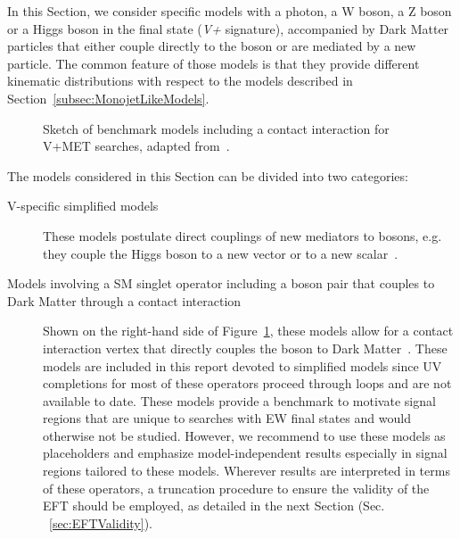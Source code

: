 
In this Section, we consider specific models with a photon, a W boson, a Z boson or a Higgs boson in the final state (\textit{V+\MET} signature), accompanied by Dark Matter particles that either couple directly to the boson or are mediated by a new particle. The common feature of those models is that they provide different kinematic distributions with respect to the models described in Section~\ref{subsec:MonojetLikeModels}.



\begin{figure}[h!]
	\centering
	\vspace{\baselineskip}
	\textwidth
	\begin{feynmandiagram}[modelVeft5pt]
	\end{feynmandiagram}
	
	\vspace{\baselineskip}
	\caption{Sketch of benchmark models including a contact interaction
		for V+MET searches, adapted from~\cite{Nelson:2013pqa}. \label{fig:VPlusMET_EFT}}
\end{figure}

The models considered in this Section can be divided into two categories:
\begin{description}
	\item[V-specific simplified models] These models postulate direct couplings of new mediators
	to bosons, e.g. they couple the Higgs boson to a new vector or to a new scalar~\cite{Carpenter:2013xra,Berlin:2014cfa}. 
	\item[Models involving a SM singlet operator including a boson pair that couples to Dark Matter through a contact interaction]
	Shown on the right-hand side of Figure~\ref{fig:VPlusMET_EFT},
	these models allow for a contact interaction vertex that directly couples the boson to Dark Matter~\cite{Cotta:2012nj, Carpenter:2012rg, Crivellin:2015wva,Berlin:2014cfa}.
	These models are included in this report devoted to simplified models since 
	UV completions for most of these operators proceed through loops and are not available to date. 
	These models provide a benchmark to motivate signal regions that are unique to searches with
	EW final states and would otherwise not be studied. However, we recommend to use these models
	as placeholders and emphasize model-independent results especially in signal regions tailored to these models. 
	Wherever results are interpreted in terms of these operators, a truncation procedure
	to ensure the validity of the EFT should be employed, as detailed in the next Section (Sec. ~\ref{sec:EFTValidity}). 
\end{description}


